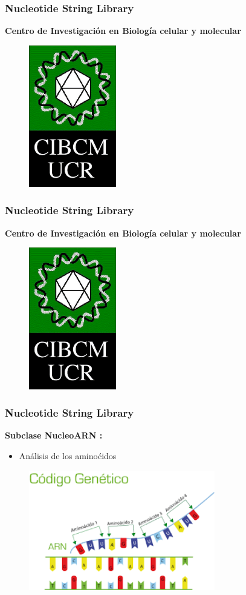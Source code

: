 \documentclass{beamer}
\begin{document}
\begin{frame}
\frametitle{Nucleotide String Library}
\textbf{\large{Centro de Investigaci\'on en Biolog\'ia celular y molecular}}
\begin{figure}
		\includegraphics[width=1.5in]{CIB.png}
\end{figure}
\end{frame}

\begin{frame}
\frametitle{Nucleotide String Library}
\textbf{\large{Centro de Investigaci\'on en Biolog\'ia celular y molecular}}
\begin{figure}
		\includegraphics[width=1.5in]{CIB.png}
\end{figure}
\end{frame}

\begin{frame}
\frametitle{Nucleotide String Library}
\textbf{\large{Subclase NucleoARN :}}
\begin{itemize}
\item{An\'alisis de los amino\'cidos }
\end{itemize}
\begin{figure}
		\includegraphics[width=3.2in]{image.png}
\end{figure}
\end{frame}
\end{document}
